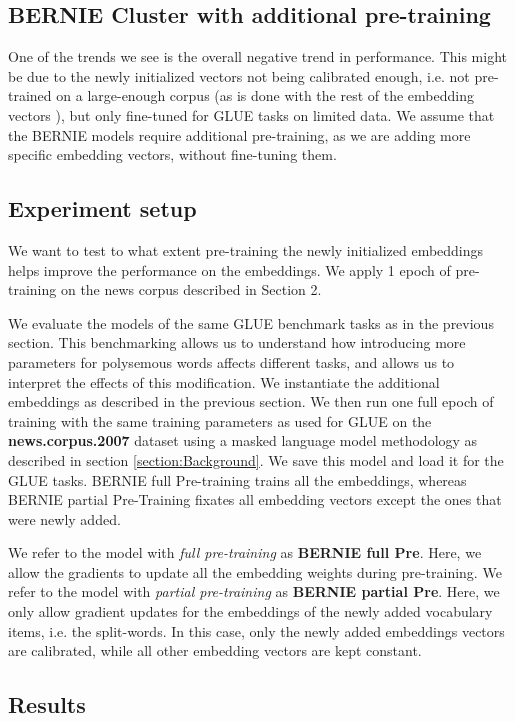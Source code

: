\documentclass[a4paper,12pt,oneside,openright]{report}
\begin{document}
\subsection{BERNIE Cluster with additional pre-training}

One of the trends we see is the overall negative trend in performance.
This might be due to the newly initialized vectors not being calibrated enough, i.e. not pre-trained on a large-enough corpus (as is done with the rest of the embedding vectors \cite{devlin18}), but only fine-tuned for GLUE tasks on limited data.
We assume that the BERNIE models require additional pre-training, as we are adding more specific embedding vectors, without fine-tuning them.

\subsection{Experiment setup}

We want to test to what extent pre-training the newly initialized embeddings helps improve the performance on the embeddings.
We apply 1 epoch of pre-training on the news corpus described in Section 2.

We evaluate the models of the same GLUE benchmark tasks as in the previous section.
This benchmarking allows us to understand how introducing more parameters for polysemous words affects different tasks, and allows us to interpret the effects of this modification.
We instantiate the additional embeddings as described in the previous section.
We then run one full epoch of training with the same training parameters as used for GLUE on the \textbf{news.corpus.2007} dataset using a masked language model methodology as described in section \ref{section:Background}.
We save this model and load it for the GLUE tasks.
BERNIE full Pre-training trains all the embeddings, whereas BERNIE partial Pre-Training fixates all embedding vectors except the ones that were newly added.

We refer to the model with \textit{full pre-training} as \textbf{BERNIE full Pre}.
Here, we allow the gradients to update all the embedding weights during pre-training.
We refer to the model with \textit{partial pre-training} as \textbf{BERNIE partial Pre}.
Here, we only allow gradient updates for the embeddings of the newly added vocabulary items, i.e. the split-words.
In this case, only the newly added embeddings vectors are calibrated, while all other embedding vectors are kept constant.


\subsection{Results}
\end{document}
